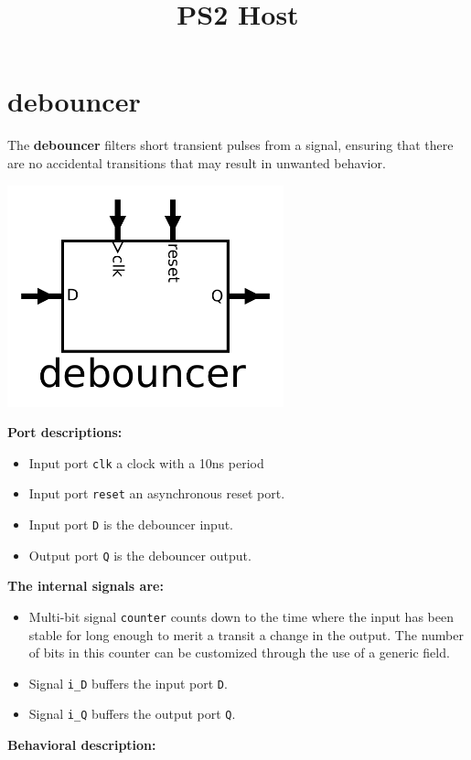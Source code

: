 \documentclass{article}
\title{PS2 Host}
\begin{document}
\section*{debouncer}

The {\bf debouncer} filters short transient pulses from a signal, ensuring that there are no accidental transitions that may result in unwanted behavior. 

\begin{center}
\includegraphics[width = 0.6\textwidth]{debouncer}
\end{center}

{\bf Port descriptions:} 
\begin{itemize} 
\item Input port \texttt{clk} a clock with a 10ns period
\item Input port \texttt{reset} an asynchronous reset port.  
\item Input port \texttt{D} is the debouncer input. 
\item Output port \texttt{Q} is the debouncer output.
\end{itemize}

{\bf The internal signals are:} 
\begin{itemize}
\item Multi-bit signal \texttt{counter} counts down to the time where the input has been stable for long enough to merit a transit a change in the output. The number of bits in this counter can be customized through the use of a generic field. 
\item Signal \texttt{i\_D} buffers the input port \texttt{D}. 
\item Signal \texttt{i\_Q} buffers the output port \texttt{Q}.
\end{itemize}

\vspace{2mm}

{\bf Behavioral description:}
\end{document}
